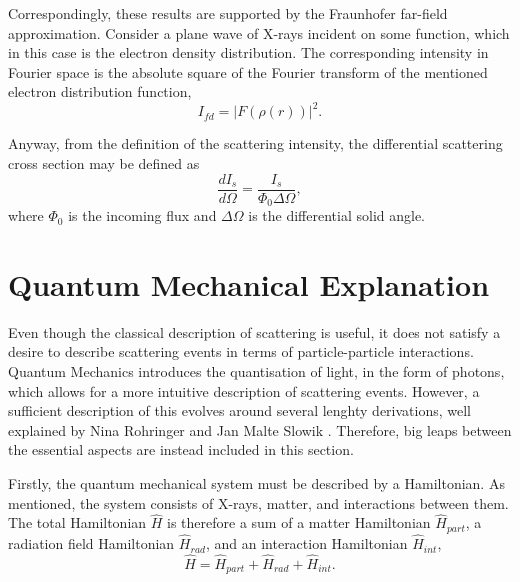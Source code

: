 Correspondingly, these results are supported by the Fraunhofer far-field approximation. Consider a plane wave of X-rays incident on some function, which in this case is the electron density distribution.
The corresponding intensity in Fourier space is the absolute square of the Fourier transform of the mentioned electron distribution function,
\begin{equation}\label{eq:Fraunhofer_intensity}
    I_{fd} = |F\left(\rho(r) \right) |^{2}.
\end{equation}

Anyway, from the definition of the scattering intensity, the differential scattering cross section may be defined as
\begin{equation}\label{eq:scattering_crossection}
    \frac{dI_{s}}{d\Omega} = \frac{I_{s}}{\Phi_{0} \Delta\Omega},
\end{equation}
where $\Phi_{0}$ is the incoming flux and $\Delta\Omega$ is the differential solid angle.



\section{Quantum Mechanical Explanation}\label{sec:quantum_scattering}

Even though the classical description of scattering is useful, it does not satisfy a desire to describe scattering events in terms of particle-particle interactions.
Quantum Mechanics introduces the quantisation of light, in the form of photons, which allows for a more intuitive description of scattering events.
However, a sufficient description of this evolves around several lenghty derivations, well explained by Nina Rohringer \cite{rohringer2020introduction} and Jan Malte Slowik \cite{slowik2015quantum}.
Therefore, big leaps between the essential aspects are instead included in this section.

Firstly, the quantum mechanical system must be described by a Hamiltonian. As mentioned, the system consists of X-rays, matter, and interactions between them.
The total Hamiltonian $\hat{H}$ is therefore a sum of a matter Hamiltonian $\hat{H}_{part}$, a radiation field Hamiltonian $\hat{H}_{rad}$, and an interaction Hamiltonian $\hat{H}_{int}$,
\begin{equation}\label{eq:total_Hamiltonian}
    \hat{H} = \hat{H}_{part} + \hat{H}_{rad} + \hat{H}_{int}.
\end{equation}

